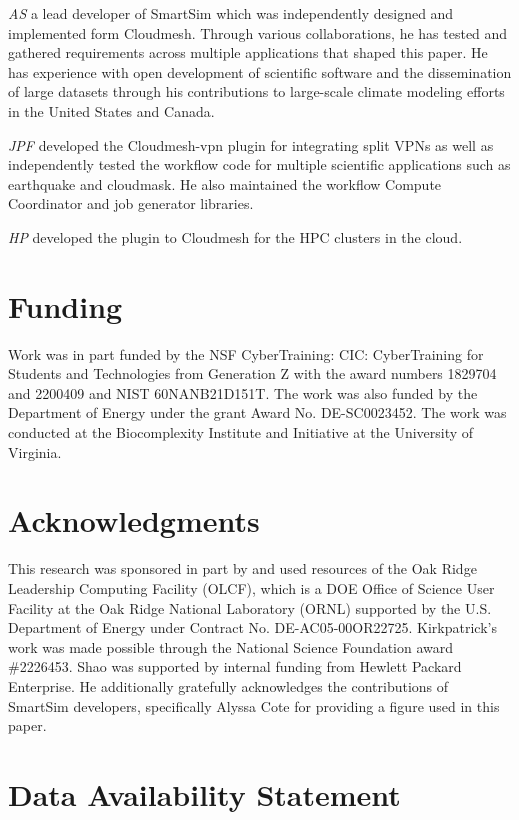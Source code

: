 \documentclass[utf8]{FrontiersinVancouver} %
\begin{document}
{\em AS} a lead developer of SmartSim which was independently designed and implemented form Cloudmesh. Through various collaborations, he has tested and gathered requirements across multiple applications that shaped this paper. He has experience with open development of scientific software and the dissemination of large datasets through his contributions to large-scale climate modeling efforts in the United States and Canada. 

{\em JPF} developed the Cloudmesh-vpn plugin for integrating split VPNs as well as independently tested the workflow code for multiple scientific applications such as earthquake and cloudmask. He also maintained the workflow Compute Coordinator and job generator libraries.

{\em HP} developed the plugin to Cloudmesh for the HPC clusters in the cloud. 


\section*{Funding}

Work was in part funded by the NSF CyberTraining: CIC: CyberTraining for Students and Technologies from Generation Z with the award numbers 1829704 and 2200409 and NIST 60NANB21D151T.  The work was also funded by the Department of Energy under the grant Award No. DE-SC0023452. The work was conducted at the Biocomplexity Institute and Initiative at the University of Virginia.

\section*{Acknowledgments}

This research was sponsored in part by and used resources of the Oak Ridge Leadership Computing Facility (OLCF), which is a DOE Office of Science User Facility at the Oak Ridge National Laboratory (ORNL) supported by the U.S. Department of Energy under Contract No. DE-AC05-00OR22725. Kirkpatrick's work was made possible through the National Science Foundation award \#2226453. Shao was supported by internal funding from Hewlett Packard Enterprise. He additionally gratefully acknowledges the contributions of SmartSim developers, specifically Alyssa Cote for providing a figure used in this paper.

\section*{Data Availability Statement}
\end{document}
